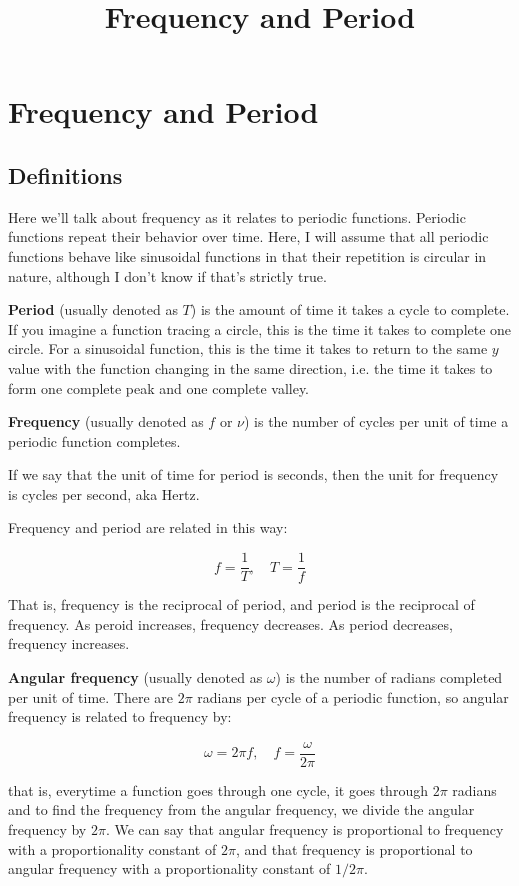 \documentclass{article}
\title{Frequency and Period}
\begin{document}
\section{Frequency and Period}

\subsection{Definitions}

Here we'll talk about frequency as it relates to periodic functions. Periodic functions repeat their behavior over time. Here, I will assume that all periodic functions behave like sinusoidal functions in that their repetition is circular in nature, although I don't know if that's strictly true.

\textbf{Period} (usually denoted as $T$) is the amount of time it takes a cycle to complete. If you imagine a function tracing a circle, this is the time it takes to complete one circle. For a sinusoidal function, this is the time it takes to return to the same $y$ value with the function changing in the same direction, i.e. the time it takes to form one complete peak and one complete valley.

\textbf{Frequency} (usually denoted as $f$ or $\nu$) is the number of cycles per unit of time a periodic function completes.

If we say that the unit of time for period is seconds, then the unit for frequency is cycles per second, aka Hertz.

Frequency and period are related in this way:

\[ \tag{a} f = \frac{1}{T}, \quad T = \frac{1}{f} \]

That is, frequency is the reciprocal of period, and period is the reciprocal of frequency. As peroid increases, frequency decreases. As period decreases, frequency increases.

\textbf{Angular frequency} (usually denoted as $\omega$) is the number of radians completed per unit of time. There are $2 \pi$ radians per cycle of a periodic function, so angular frequency is related to frequency by:

\[ \tag{b} \omega = 2 \pi f, \quad f = \frac{\omega}{2 \pi} \]

that is, everytime a function goes through one cycle, it goes through $2 \pi$ radians and to find the frequency from the angular frequency, we divide the angular frequency by ${2 \pi}$. We can say that angular frequency is proportional to frequency with a proportionality constant of $2 \pi$, and that frequency is proportional to angular frequency with a proportionality constant of $1/2 \pi$.
\end{document}
